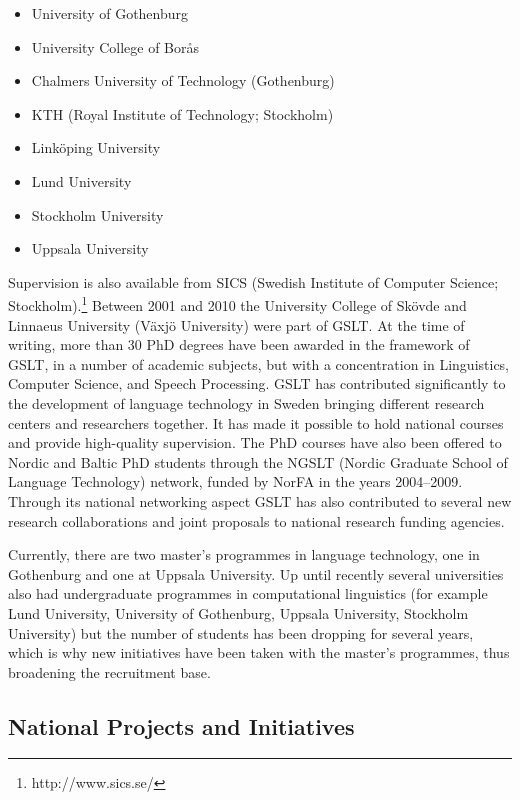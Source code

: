 \begin{multicols}{2}
\begin{itemize}
\item University of Gothenburg
\item University College of Borås
\item Chalmers University of Technology (Gothenburg)
\item KTH (Royal Institute of Technology; Stockholm)
\item Linköping University
\item Lund University
\item Stockholm University
\item Uppsala University
\end{itemize}

Supervision is also available from SICS (Swedish Institute of Computer
Science; Stockholm).\footnote{http://www.sics.se/} Between 2001 and
2010 the University College of Skövde and Linnaeus University (Växjö
University) were part of GSLT. At the time of writing, more than 30
PhD degrees have been awarded in the framework of GSLT, in a number of
academic subjects, but with a concentration in Linguistics, Computer
Science, and Speech Processing. GSLT has contributed significantly to
the development of language technology in Sweden bringing different
research centers and researchers together. It has made it possible to
hold national courses and provide high-quality supervision. The PhD
courses have also been offered to Nordic and Baltic PhD students
through the NGSLT (Nordic Graduate School of Language Technology)
network, funded by NorFA in the years 2004–2009. Through its national
networking aspect GSLT has also contributed to several new research
collaborations and joint proposals to national research funding
agencies.

Currently, there are two master’s programmes in language technology,
one in Gothenburg and one at Uppsala University. Up until recently
several universities also had undergraduate programmes in
computational linguistics (for example Lund University, University of
Gothenburg, Uppsala University, Stockholm University) but the number
of students has been dropping for several years, which is why new
initiatives have been taken with the master's programmes, thus
broadening the recruitment base.

\subsection{National Projects and Initiatives}


\end{multicols}

